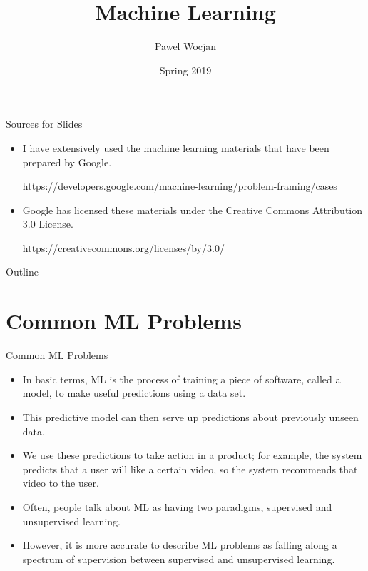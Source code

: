 \documentclass{beamer}
\title[ML]{Machine Learning}
\author{Pawel Wocjan}
\institute{University of Central Florida}
\date{Spring 2019}
\begin{document}
\begin{frame}
  \titlepage
\end{frame}

\begin{frame}{Sources for Slides}

\begin{itemize}
\item I have extensively used the machine learning materials that have been prepared by Google. 

{\small 
\url{https://developers.google.com/machine-learning/problem-framing/cases}
}

\item Google has licensed these materials under the Creative Commons Attribution 3.0 License.

{\small 
\url{https://creativecommons.org/licenses/by/3.0/}
}
\end{itemize}
\end{frame}

\begin{frame}{Outline}
  \tableofcontents
\end{frame}

\section{Common ML Problems}

\begin{frame}{Common ML Problems}

\begin{itemize}

\item In basic terms, ML is the process of training a piece of software, called a model, to make useful predictions using a data set. 

\item This predictive model can then serve up predictions about previously unseen data. 

\item We use these predictions to take action in a product; for example, the system predicts that a user will like a certain video, so the system recommends that video to the user.

\item Often, people talk about ML as having two paradigms, supervised and unsupervised learning. 

\item However, it is more accurate to describe ML problems as falling along a spectrum of supervision between supervised and unsupervised learning.
\end{itemize}

\end{frame}
\end{document}
